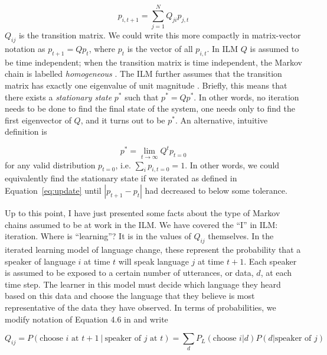 \documentclass[11pt,letterpaper]{article}
\begin{document}
\begin{equation}
  p_{i,t+1} = \sum_{j=1}^N Q_{ji} p_{j,t}
\label{eq:update}
\end{equation}
\noindent
$Q_{ij}$ is the transition matrix. We could write this more compactly in
matrix-vector notation as $p_{t+1} = Qp_{t}$, where $p_t$ is the vector of all
$p_{i,t}$. In ILM $Q$ is assumed to be time independent;  %
when the transition matrix is time independent, the Markov chain is  %
labelled \emph{homogeneous} \cite[p. 445]{Griffiths2007a}. The ILM further assumes  %
that the transition matrix has exactly one eigenvalue of unit magnitude \cite[p. 446]{Griffiths2007a}.  %
Briefly, this means that there exists a \emph{stationary state} 
$p^*$ such that $p^* = Qp^*$. In other words, no iteration needs to be 
done to find the final state of the system, one needs only to find the first
eigenvector of $Q$, and it turns out to be $p^*$. An alternative, intuitive
definition is

\begin{equation}
  p^* = \lim_{t \to \infty} Q^t p_{t=0}
\end{equation}
\noindent
for any valid distribution $p_{t=0}$, i.e. $\sum_i p_{i,t=0} = 1$. 
In other words, we could equivalently find the stationary state if we iterated
as defined in Equation~\ref{eq:update}
until $|p_{t+1} - p_{t}|$ had decreased to below some tolerance.

Up to this point, I have just presented some facts about the type of Markov
chains assumed to be at work in the ILM. We have covered the ``I'' in ILM:
iteration. Where is ``learning''? It is in the values of $Q_{ij}$ themselves.
In the iterated learning model of language change, these represent the 
probability that a speaker of language $i$ at time $t$ will speak language
$j$ at time $t+1$. Each speaker is assumed to be 
exposed to a certain number of utterances, or data, $d$, at each time step. 
The learner in this model must decide which language they heard based on this
data and choose the language that they believe is most representative of the
data they have observed. In terms of probabilities, we modify notation of 
Equation 4.6 in \cite{Smith2008} and write

\begin{equation}
  Q_{ij} = P(\text{choose $i$ at $t+1$}~|~\text{speaker of $j$ at $t$}) = \sum_d P_L(\text{choose $i$}|d) P(d|\text{speaker of $j$})
  \label{eq:qij-elements}
\end{equation}
\end{document}
